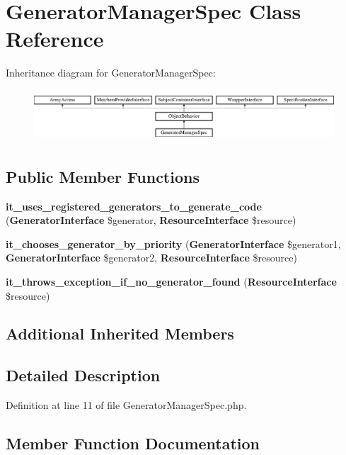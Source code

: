 \section{Generator\+Manager\+Spec Class Reference}
\label{classspec_1_1_php_spec_1_1_code_generator_1_1_generator_manager_spec}
Inheritance diagram for Generator\+Manager\+Spec\+:\begin{figure}[H]
\begin{center}
\leavevmode
\includegraphics[height=1.953488cm]{classspec_1_1_php_spec_1_1_code_generator_1_1_generator_manager_spec}
\end{center}
\end{figure}
\subsection*{Public Member Functions}
\begin{DoxyCompactItemize}
\item 
{\bf it\+\_\+uses\+\_\+registered\+\_\+generators\+\_\+to\+\_\+generate\+\_\+code} ({\bf Generator\+Interface} \$generator, {\bf Resource\+Interface} \$resource)
\item 
{\bf it\+\_\+chooses\+\_\+generator\+\_\+by\+\_\+priority} ({\bf Generator\+Interface} \$generator1, {\bf Generator\+Interface} \$generator2, {\bf Resource\+Interface} \$resource)
\item 
{\bf it\+\_\+throws\+\_\+exception\+\_\+if\+\_\+no\+\_\+generator\+\_\+found} ({\bf Resource\+Interface} \$resource)
\end{DoxyCompactItemize}
\subsection*{Additional Inherited Members}


\subsection{Detailed Description}


Definition at line 11 of file Generator\+Manager\+Spec.\+php.



\subsection{Member Function Documentation}
